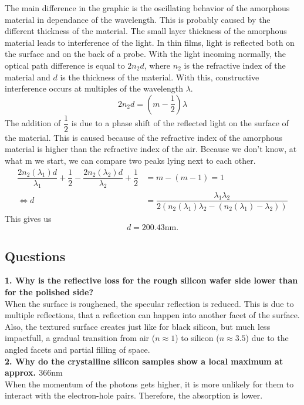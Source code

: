 The main difference in the graphic is the oscillating behavior of the amorphous material in dependance of the wavelength. 
This is probably caused by the different thickness of the material. The small layer thickness of the amorphous material leads 
to interference of the light. In thin films, light is reflected both on the surface and on the 
back of a probe. With the light incoming normally, the optical path difference is equal to $2 n_2 d$, where $n_2$ is the 
refractive index of the material and $d$ is the thickness of the material. With this, constructive interference occurs at multiples 
of the wavelength $\lambda$.
\begin{equation}
  2 n_2 d = (m-\dfrac{1}{2})\lambda
\end{equation}
The addition of $\dfrac{1}{2}$ is due to a phase shift of the reflected light on the surface of the material. This is caused because 
of the refractive index of the amorphous material is higher than the refractive index of the air.
Because we don't know, at what m we start, we can compare two peaks lying next to each other. 
\begin{align*}
  \dfrac{2 n_2(\lambda_1) d}{\lambda_1} + \dfrac{1}{2} - \dfrac{2 n_2(\lambda_2) d}{\lambda_2} + \dfrac{1}{2} &= m - (m-1) = 1 \\
  \Leftrightarrow d &= \dfrac{\lambda_1 \lambda_2}{2 (n_2(\lambda_1) \lambda_2 - (n_2(\lambda_1) - \lambda_2))}
\end{align*}
This gives us
\begin{equation*}
  d = 200.43 \si{\nano\meter}.
\end{equation*}

\subsection{Questions}
\textbf{1. Why is the reflective loss for the rough silicon wafer side lower than for the polished side?}\\
When the surface is roughened, the specular reflection is reduced. This is due to multiple reflections, that a reflection can happen into 
another facet of the surface. Also, the textured surface creates just like for black silicon, but much less impactfull,
a gradual transition from air ($n \approx 1$) to silicon ($n \approx 3.5$) due to the angled facets and partial filling of space. \\

\textbf{2. Why do the crystalline silicon samples show a local maximum at approx. $366 \si{\nano\meter}$}\\
When the momentum of the photons gets higher, it is more unlikely for them to interact with the electron-hole pairs. 
Therefore, the absorption is lower.\\

